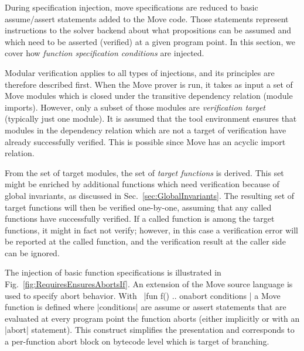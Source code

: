 
During specification injection, move specifications are reduced to basic
assume/assert statements added to the Move code.  Those statements represent
instructions to the solver backend about what propositions can be assumed and
which need to be asserted (verified) at a given program point.  In this section,
we cover how \emph{function specification conditions} are injected.


\label{sec:ModularVerification}



Modular verification applies to all types of injections, and its principles are
therefore described first. When the Move prover is run, it takes as input a set
of Move modules which is closed under the transitive dependency relation (module
imports). However, only a subset of those modules are \emph{verification target}
(typically just one module). It is assumed that the tool environment ensures
that modules in the dependency relation which are not a target of verification
have already successfully verified. This is possible since Move has an acyclic
import relation.

From the set of target modules, the set of \emph{target functions} is
derived. This set might be enriched by additional functions which need
verification because of global invariants, as discussed in
Sec.~\ref{sec:GlobalInvariants}. The resulting set of target functions will then
be verified one-by-one, assuming that any called functions have successfully
verified. If a called function is among the target functions, it might in fact
not verify; however, in this case a verification error will be reported at the
called function, and the verification result at the caller side can be ignored.


The injection of basic function specifications is illustrated in
Fig.~\ref{fig:RequiresEnsuresAbortsIf}.  An extension of the Move source
language is used to specify abort behavior. With~%
|fun f() { .. } onabort { conditions }| a Move function is defined where
|conditions| are assume or assert statements that are evaluated at every program
point the function aborts (either implicitly or with an |abort| statement). This
construct simplifies the presentation and corresponds to a per-function abort
block on bytecode level which is target of branching.

